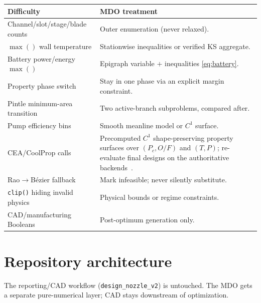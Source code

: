 \documentclass[11pt]{article}
\newcommand{\cmd}[1]{\nolinkurl{#1}}
\begin{document}
\begin{center}
\small
\begin{tabular}{@{}p{5.6cm}p{7.4cm}@{}}
\toprule
\textbf{Difficulty} & \textbf{MDO treatment} \\
\midrule
Channel/slot/stage/blade counts & Outer enumeration (never relaxed). \\
$\max()$ wall temperature & Stationwise inequalities or verified KS aggregate. \\
Battery power/energy $\max()$ & Epigraph variable $+$ inequalities \eqref{eq:battery}. \\
Property phase switch & Stay in one phase via an explicit margin constraint. \\
Pintle minimum-area transition & Two active-branch subproblems, compared after. \\
Pump efficiency bins & Smooth meanline model or $C^1$ surface. \\
CEA/CoolProp calls & Precomputed $C^1$ shape-preserving property surfaces over $(P_c,O/F)$ and $(T,P)$; re-evaluate final designs on the authoritative backends~\cite{cea1311}. \\
Rao$\to$B\'ezier fallback & Mark infeasible; never silently substitute. \\
\cmd{clip()} hiding invalid physics & Physical bounds or regime constraints. \\
CAD/manufacturing Booleans & Post-optimum generation only. \\
\bottomrule
\end{tabular}
\end{center}

\section{Repository architecture}

The reporting/CAD workflow (\cmd{design\_nozzle\_v2}) is untouched. The MDO gets
a separate pure-numerical layer; CAD stays downstream of optimization.
\end{document}
